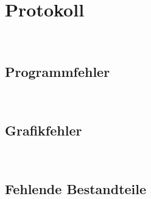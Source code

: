 %



\newpage



\section{Protokoll}
\label{Abschnitt:Programmfehler:Protokoll}


~\\




\subsection*{Programmfehler}

~\\


\subsection*{Grafikfehler}

~\\



\subsection*{Fehlende Bestandteile}

~\\


